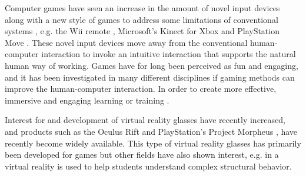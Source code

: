 Computer games have seen an increase in the amount of novel input devices along with a new style of games to address some limitations of conventional systems \cite{Kosmadoudi2013}, e.g. the Wii remote \cite{Nintendo}, Microsoft’s Kinect for Xbox \cite{Microsoft} and PlayStation Move \cite{Playstationa}. These novel input devices move away from the conventional human-computer interaction to invoke an intuitive interaction that supports the natural human way of working. Games have for long been perceived as fun and engaging, and it has been investigated in many different disciplines if gaming methods can improve the human-computer interaction. In order to create more effective, immersive and engaging learning or training \cite{Kosmadoudi2013}. 

Interest for and development of virtual reality glasses have recently increased, and products such as the Oculus Rift \cite{Oculus} and PlayStation’s Project Morpheus \cite{Playstation}, have recently become widely available. This type of virtual reality glasses has primarily been developed for games but other fields have also shown interest, e.g. in \cite{fogarty2014exploring} a virtual reality is used to help students understand complex structural behavior.

